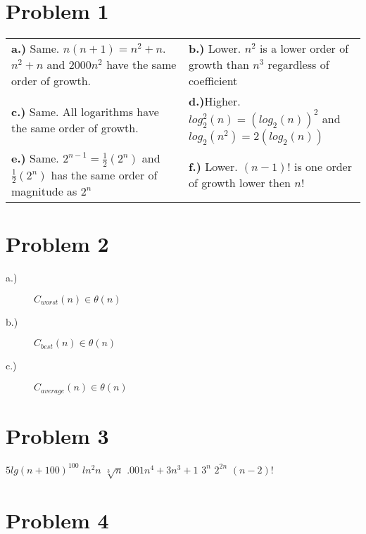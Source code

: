 \documentclass[12pt,letterpaper]{article}
\begin{document}
\section*{Problem 1}
\begin{tabular}{p{0.5\linewidth}p{0.5\linewidth}}
\textbf{a.)} Same. $n(n+1) = n^2+n$. $n^2+n$ and $2000n^2$ have the same order of growth. & \textbf{b.)} Lower. $n^2$ is a lower order of growth than $n^3$ regardless of coefficient\\
\textbf{c.)} Same. All logarithms have the same order of growth. & \textbf{d.)}Higher. $log_2^2(n) = (log_2(n))^2$ and $log_2(n^2) = 2(log_2(n))$\\
\textbf{e.)} Same. $2^{n-1} = \frac{1}{2}(2^n)$ and $\frac{1}{2}(2^n)$ has the same order of magnitude as $2^n$ & \textbf{f.)} Lower. $(n-1)!$ is one order of growth lower then $n!$\\
\end{tabular}

\section*{Problem 2}
\begin{description}
    \item [a.)]$C_{worst}(n) \in \theta(n)$  
    \item [b.)]$C_{best}(n) \in \theta(n)$  
    \item [c.)]$C_{average}(n) \in \theta(n)$  
\end{description}

\section*{Problem 3}

$5lg(n+100)^{100}$ \xrightarrow{} $ln^2n$ \xrightarrow{} $\sqrt[3]{n}$ \xrightarrow{} $.001n^4+3n^3+1$ \xrightarrow{} $3^n$ \xrightarrow{} $2^{2n}$ \xrightarrow{} $(n-2)!$

\section*{Problem 4}
\end{document}
